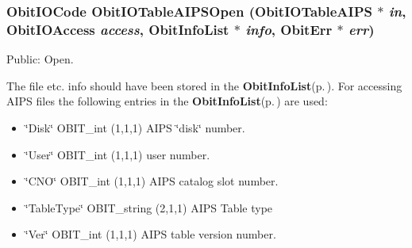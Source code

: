 \subsubsection{\setlength{\rightskip}{0pt plus 5cm}Obit\-IOCode Obit\-IOTable\-AIPSOpen ({\bf Obit\-IOTable\-AIPS} $\ast$ {\em in}, Obit\-IOAccess {\em access}, {\bf Obit\-Info\-List} $\ast$ {\em info}, {\bf Obit\-Err} $\ast$ {\em err})}\label{ObitIOTableAIPS_8h_a9}


Public: Open. 

The file etc. info should have been stored in the {\bf Obit\-Info\-List}{\rm (p.\,\pageref{structObitInfoList})}. For accessing AIPS files the following entries in the {\bf Obit\-Info\-List}{\rm (p.\,\pageref{structObitInfoList})} are used: \begin{itemize}
\item \char`\"{}Disk\char`\"{} OBIT\_\-int (1,1,1) AIPS \char`\"{}disk\char`\"{} number. \item \char`\"{}User\char`\"{} OBIT\_\-int (1,1,1) user number. \item \char`\"{}CNO\char`\"{} OBIT\_\-int (1,1,1) AIPS catalog slot number. \item \char`\"{}Table\-Type\char`\"{} OBIT\_\-string (2,1,1) AIPS Table type \item \char`\"{}Ver\char`\"{} OBIT\_\-int (1,1,1) AIPS table version number. 
\end{itemize}
